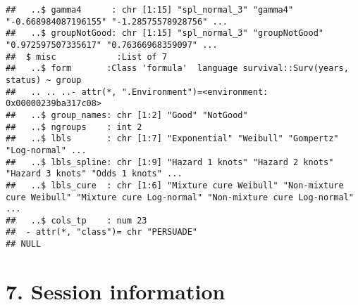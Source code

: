 \documentclass[
]{article}
\begin{document}
\begin{verbatim}
##   ..$ gamma4      : chr [1:15] "spl_normal_3" "gamma4" "-0.668984087196155" "-1.28575578928756" ...
##   ..$ groupNotGood: chr [1:15] "spl_normal_3" "groupNotGood" "0.972597507335617" "0.76366968359097" ...
##  $ misc            :List of 7
##   ..$ form       :Class 'formula'  language survival::Surv(years, status) ~ group
##   .. .. ..- attr(*, ".Environment")=<environment: 0x00000239ba317c08> 
##   ..$ group_names: chr [1:2] "Good" "NotGood"
##   ..$ ngroups    : int 2
##   ..$ lbls       : chr [1:7] "Exponential" "Weibull" "Gompertz" "Log-normal" ...
##   ..$ lbls_spline: chr [1:9] "Hazard 1 knots" "Hazard 2 knots" "Hazard 3 knots" "Odds 1 knots" ...
##   ..$ lbls_cure  : chr [1:6] "Mixture cure Weibull" "Non-mixture cure Weibull" "Mixture cure Log-normal" "Non-mixture cure Log-normal" ...
##   ..$ cols_tp    : num 23
##  - attr(*, "class")= chr "PERSUADE"
## NULL
\end{verbatim}

\clearpage

\section{7. Session information}\label{session-information}
\end{document}
